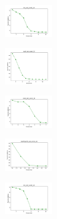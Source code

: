 \begin{figure}[H]
    \centering
    \begin{subfigure}
        \centering
        \includegraphics[width=0.234\textwidth]{img/es/iris_set_const_10_949004259_cost.png}
    \end{subfigure}
    \hfill
    \begin{subfigure}
        \centering
        \includegraphics[width=0.234\textwidth]{img/es/ecoli_set_const_10_949004259_cost.png}
    \end{subfigure}
    \hfill
    \begin{subfigure}
        \centering
        \includegraphics[width=0.234\textwidth]{img/es/rand_set_const_10_949004259_cost.png}
    \end{subfigure}
    \hfill
    \begin{subfigure}
        \centering
        \includegraphics[width=0.234\textwidth]{img/es/newthyroid_set_const_10_949004259_cost.png}
    \end{subfigure}
    \hfill
    \begin{subfigure}
        \centering
        \includegraphics[width=0.234\textwidth]{img/es/iris_set_const_10_589741062_cost.png}
    \end{subfigure}

\end{figure}
